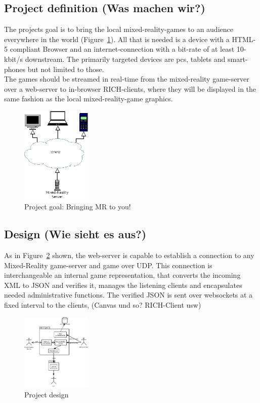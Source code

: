 \documentclass[journal]{IEEEtran}
\begin{document}
\subsection{Project definition (Was machen wir?)}
The projects goal is to bring the local mixed-reality-games to an audience everywhere in the world (Figure~\ref{fig:proj_goal}). All that is needed is a device with a HTML-5 compliant Browser and an internet-connection with a bit-rate of at least 10-kbit/s downstream.
The primarily targeted devices are pcs, tablets and smart-phones but not limited to those. \\
The games should be streamed in real-time from the mixed-reality game-server over a web-server to in-browser RICH-clients, where they will be displayed in the same fashion as the local mixed-reality-game graphics.
\begin{figure}[!t]
    \centering
    \includegraphics[width=0.3\textwidth]{project-target.png}
    \caption{Project goal: Bringing MR to you!}
    \label{fig:proj_goal}
\end{figure}
\subsection{Design (Wie sieht es aus?)}
As in Figure~\ref{fig:proj_design} shown, the web-server is capable to establish a connection to any Mixed-Reality game-server and game over UDP. This connection is interchangeable an internal game representation, that converts the incoming XML to JSON and verifies it, manages the listening clients and encapsulates needed administrative functions. The verified JSON is sent over websockets at a fixed interval to the clients, (Canvas und so? RICH-Client usw)
\begin{figure}[!t]
    \centering
    \includegraphics[width=0.3\textwidth]{design.png}
    \caption{Project design}
    \label{fig:proj_design}
\end{figure}
\end{document}
